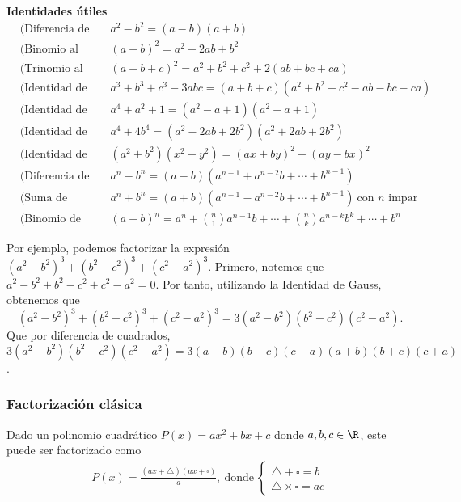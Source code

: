\textbf{Identidades útiles}
\begin{align*}
    &\text{(Diferencia de cuadrados)} && a^2 - b^2 = (a - b)(a + b)\\[2mm]
    &\text{(Binomio al cuadrado)} && (a + b)^2 = a^2 + 2ab + b^2\\[2mm]
    &\text{(Trinomio al cuadrado)} && (a + b + c)^2 = a^2 + b^2 + c^2 + 2(ab + bc + ca)\\[2mm]
    &\text{(Identidad de Gauss)} && a^3 + b^3 + c^3 - 3abc = (a + b + c)(a^2 + b^2 + c^2 - ab - bc - ca)\\[2mm]
    &\text{(Identidad de Argand)} && a^4 + a^2 + 1 = (a^2 - a + 1)(a^2 + a + 1)\\[2mm]
    &\text{(Identidad de Sophie Germain)} && a^4 + 4 b^4 = (a^2 - 2ab + 2b^2)\left(a^2 + 2ab + 2b^2\right)\\[2mm]
    &\text{(Identidad de Brahmagupta)} && (a^2 + b^2) (x^2 + y^2) = (ax + by)^2 + (ay - bx)^2\\[2mm]
    &\text{(Diferencia de potencias)} && a^n - b^n = (a - b)(a^{n - 1} + a^{n - 2}b + \cdots + b^{n - 1})\\[2mm]
    &\text{(Suma de potencias)} && a^n + b^n = (a + b)(a^{n - 1} - a^{n - 2}b + \cdots + b^{n - 1}) \ \text{con $n$ impar}\\[1.5mm]
    &\text{(Binomio de Newton)} && (a + b)^n = a^n + \binom{n}{1} a^{n - 1}b + \cdots + \binom{n}{k} a^{n -k}b^k + \cdots + b^n
\end{align*}

Por ejemplo, podemos factorizar la expresión $(a^2 - b^2)^3 + (b^2 - c^2)^3 + (c^2 - a^2)^3$.
Primero, notemos que $a^2 - b^2 + b^2 - c^2 + c^2 - a^2 = 0$.
Por tanto, utilizando la Identidad de Gauss, obtenemos que
\[
    (a^2 - b^2)^3 + (b^2 - c^2)^3 + (c^2 - a^2)^3 = 3 (a^2 - b^2)(b^2 - c^2)(c^2 - a^2).
\]
Que por diferencia de cuadrados, $3 (a^2 - b^2)(b^2 - c^2)(c^2 - a^2) = 3 (a - b)(b - c)(c - a) (a + b)(b + c)(c + a)$.



\subsubsection{Factorización clásica}

Dado un polinomio cuadrático $P(x) = ax^2 + bx + c$ donde $a, b, c \in \R$, este puede ser factorizado como
\begin{gather*}
    P(x) = \frac{(ax + \triangle)(ax + \square)}{a},\ \text{donde}\
    \begin{cases}
        \triangle + \square = b\\
        \triangle \times \square = ac
    \end{cases}
\end{gather*}

